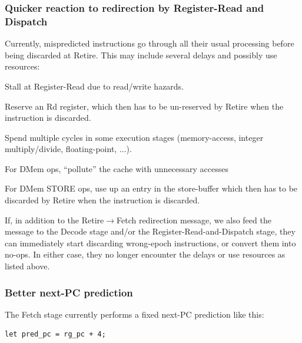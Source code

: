 \subsubsection{Quicker reaction to redirection by Register-Read and Dispatch}

Currently, mispredicted instructions go through all their usual
processing before being discarded at Retire.  This may include several
delays and possibly use resources:

\begin{tightlist}
 \item Stall at Register-Read due to read/write hazards.

 \item Reserve an Rd register, which then has to be un-reserved by
       Retire when the instruction is discarded.

 \item Spend multiple cycles in some execution stages (memory-access,
       integer multiply/divide, floating-point, ...).

 \item For DMem ops, ``pollute'' the cache with unnecessary accesses 

 \item For DMem STORE ops, use up an entry in the store-buffer which
       then has to be discarded by Retire when the instruction is
       discarded.

\end{tightlist}

If, in addition to the Retire$\longrightarrow$Fetch redirection
message, we also feed the message to the Decode stage and/or the
Register-Read-and-Dispatch stage, they can immediately start
discarding wrong-epoch instructions, or convert them into no-ops.  In
either case, they no longer encounter the delays or use resources as
listed above.


\subsubsection{Better next-PC prediction}

\label{Sec_better_next_PC_prediction}

The Fetch stage currently performs a fixed next-PC prediction like this:

{\small
\begin{Verbatim}[frame=single, label=src\_Fife/S1\_Fetch.bsv]
      let pred_pc = rg_pc + 4;
\end{Verbatim}
}

